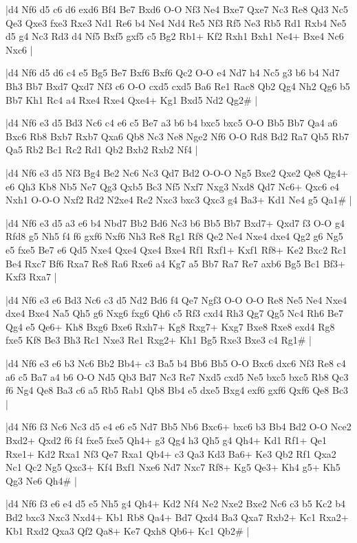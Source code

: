 \whitename{}
\blackname{}
\makegametitle
|d4 Nf6 d5 c6 d6 exd6 Bf4 Be7 Bxd6 O-O Nf3 Ne4 Bxe7 Qxe7 Nc3 Re8 Qd3 Nc5 Qe3 Qxe3 fxe3 Rxe3 Nd1 Re6 b4 Ne4 Nd4 Re5 Nf3 Rf5 Ne3 Rb5 Rd1 Rxb4 Ne5 d5 g4 Nc3 Rd3 d4 Nf5 Bxf5 gxf5 c5 Bg2 Rb1+ Kf2 Rxh1 Bxh1 Ne4+ Bxe4 Nc6 Nxc6  |

\whitename{}
\blackname{}
\makegametitle
|d4 Nf6 d5 d6 c4 e5 Bg5 Be7 Bxf6 Bxf6 Qc2 O-O e4 Nd7 h4 Nc5 g3 b6 b4 Nd7 Bh3 Bb7 Bxd7 Qxd7 Nf3 c6 O-O cxd5 cxd5 Ba6 Re1 Rac8 Qb2 Qg4 Nh2 Qg6 b5 Bb7 Kh1 Rc4 a4 Rxe4 Rxe4 Qxe4+ Kg1 Bxd5 Nd2 Qg2\#  |

\whitename{}
\blackname{}
\makegametitle
|d4 Nf6 e3 d5 Bd3 Nc6 c4 e6 c5 Be7 a3 b6 b4 bxc5 bxc5 O-O Bb5 Bb7 Qa4 a6 Bxc6 Rb8 Bxb7 Rxb7 Qxa6 Qb8 Nc3 Ne8 Nge2 Nf6 O-O Rd8 Bd2 Ra7 Qb5 Rb7 Qa5 Rb2 Bc1 Rc2 Rd1 Qb2 Bxb2 Rxb2 Nf4  |

\whitename{}
\blackname{}
\makegametitle
|d4 Nf6 e3 d5 Nf3 Bg4 Be2 Nc6 Nc3 Qd7 Bd2 O-O-O Ng5 Bxe2 Qxe2 Qe8 Qg4+ e6 Qh3 Kb8 Nb5 Ne7 Qg3 Qxb5 Bc3 Nf5 Nxf7 Nxg3 Nxd8 Qd7 Nc6+ Qxc6 e4 Nxh1 O-O-O Nxf2 Rd2 N2xe4 Re2 Nxc3 bxc3 Qxc3 g4 Ba3+ Kd1 Ne4 g5 Qa1\#  |

\whitename{}
\blackname{}
\makegametitle
|d4 Nf6 e3 d5 a3 e6 b4 Nbd7 Bb2 Bd6 Nc3 b6 Bb5 Bb7 Bxd7+ Qxd7 f3 O-O g4 Rfd8 g5 Nh5 f4 f6 gxf6 Nxf6 Nh3 Re8 Rg1 Rf8 Qe2 Ne4 Nxe4 dxe4 Qg2 g6 Ng5 e5 fxe5 Be7 e6 Qd5 Nxe4 Qxe4 Qxe4 Bxe4 Rf1 Rxf1+ Kxf1 Rf8+ Ke2 Bxc2 Rc1 Be4 Rxc7 Bf6 Rxa7 Re8 Ra6 Rxe6 a4 Kg7 a5 Bb7 Ra7 Re7 axb6 Bg5 Bc1 Bf3+ Kxf3 Rxa7  |

\whitename{}
\blackname{}
\makegametitle
|d4 Nf6 e3 e6 Bd3 Nc6 c3 d5 Nd2 Bd6 f4 Qe7 Ngf3 O-O O-O Re8 Ne5 Ne4 Nxe4 dxe4 Bxe4 Na5 Qh5 g6 Nxg6 fxg6 Qh6 c5 Rf3 cxd4 Rh3 Qg7 Qg5 Nc4 Rh6 Be7 Qg4 e5 Qe6+ Kh8 Bxg6 Bxe6 Rxh7+ Kg8 Rxg7+ Kxg7 Bxe8 Rxe8 exd4 Rg8 fxe5 Kf8 Be3 Bh3 Rc1 Nxe3 Re1 Rxg2+ Kh1 Bg5 Rxe3 Bxe3 c4 Rg1\#  |

\whitename{}
\blackname{}
\makegametitle
|d4 Nf6 e3 e6 b3 Nc6 Bb2 Bb4+ c3 Ba5 b4 Bb6 Bb5 O-O Bxc6 dxc6 Nf3 Re8 c4 a6 c5 Ba7 a4 b6 O-O Nd5 Qb3 Bd7 Nc3 Re7 Nxd5 cxd5 Ne5 bxc5 bxc5 Rb8 Qc3 f6 Ng4 Qe8 Ba3 c6 a5 Rb5 Rab1 Qb8 Bb4 e5 dxe5 Bxg4 exf6 gxf6 Qxf6 Qe8 Bc3  |

\whitename{}
\blackname{}
\makegametitle
|d4 Nf6 f3 Nc6 Nc3 d5 e4 e6 e5 Nd7 Bb5 Nb6 Bxc6+ bxc6 b3 Bb4 Bd2 O-O Nce2 Bxd2+ Qxd2 f6 f4 fxe5 fxe5 Qh4+ g3 Qg4 h3 Qh5 g4 Qh4+ Kd1 Rf1+ Qe1 Rxe1+ Kd2 Rxa1 Nf3 Qe7 Rxa1 Qb4+ c3 Qa3 Kd3 Ba6+ Ke3 Qb2 Rf1 Qxa2 Nc1 Qc2 Ng5 Qxc3+ Kf4 Bxf1 Nxe6 Nd7 Nxc7 Rf8+ Kg5 Qe3+ Kh4 g5+ Kh5 Qg3 Ne6 Qh4\#  |

\whitename{}
\blackname{}
\makegametitle
|d4 Nf6 f3 e6 e4 d5 e5 Nh5 g4 Qh4+ Kd2 Nf4 Ne2 Nxe2 Bxe2 Nc6 c3 b5 Kc2 b4 Bd2 bxc3 Nxc3 Nxd4+ Kb1 Rb8 Qa4+ Bd7 Qxd4 Ba3 Qxa7 Rxb2+ Kc1 Rxa2+ Kb1 Rxd2 Qxa3 Qf2 Qa8+ Ke7 Qxh8 Qb6+ Kc1 Qb2\#  |

